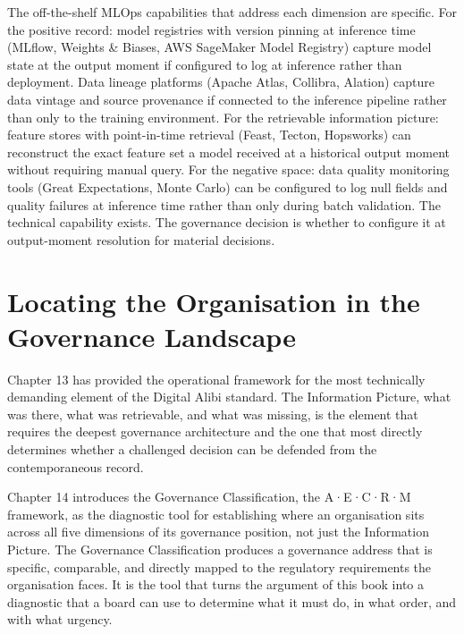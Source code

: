 The off-the-shelf MLOps capabilities that address each dimension are specific. For the positive record: model registries with version pinning at inference time (MLflow, Weights \& Biases, AWS SageMaker Model Registry) capture model state at the output moment if configured to log at inference rather than deployment. Data lineage platforms (Apache Atlas, Collibra, Alation) capture data vintage and source provenance if connected to the inference pipeline rather than only to the training environment. For the retrievable information picture: feature stores with point-in-time retrieval (Feast, Tecton, Hopsworks) can reconstruct the exact feature set a model received at a historical output moment without requiring manual query. For the negative space: data quality monitoring tools (Great Expectations, Monte Carlo) can be configured to log null fields and quality failures at inference time rather than only during batch validation. The technical capability exists. The governance decision is whether to configure it at output-moment resolution for material decisions.

\scenebreak

\section{Locating the Organisation in the Governance Landscape}

Chapter 13 has provided the operational framework for the most technically demanding element of the Digital Alibi standard. The Information Picture, what was there, what was retrievable, and what was missing, is the element that requires the deepest governance architecture and the one that most directly determines whether a challenged decision can be defended from the contemporaneous record.

Chapter 14 introduces the Governance Classification, the A·E·C·R·M framework, as the diagnostic tool for establishing where an organisation sits across all five dimensions of its governance position, not just the Information Picture. The Governance Classification produces a governance address that is specific, comparable, and directly mapped to the regulatory requirements the organisation faces. It is the tool that turns the argument of this book into a diagnostic that a board can use to determine what it must do, in what order, and with what urgency.
